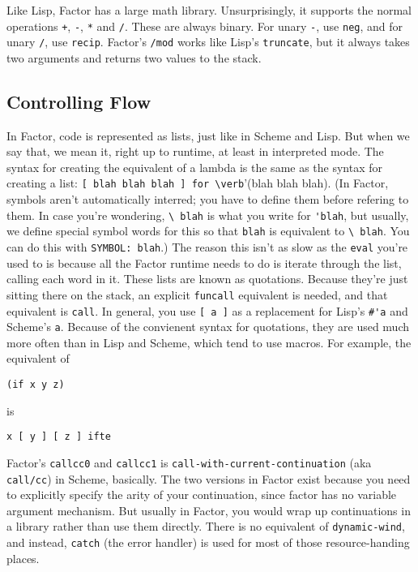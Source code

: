 \documentclass{article}
\begin{document}
Like Lisp, Factor has a large math library. Unsurprisingly, it supports the normal operations \texttt{+}, \texttt{-}, \texttt{*} and \texttt{/}. These are always binary. For unary \texttt{-}, use \texttt{neg}, and for unary \texttt{/}, use \texttt{recip}. Factor's \texttt{/mod} works like Lisp's \texttt{truncate}, but it always takes two arguments and returns two values to the stack.

\subsection{Controlling Flow}

In Factor, code is represented as lists, just like in Scheme and Lisp. But when we say that, we mean it, right up to runtime, at least in interpreted mode. The syntax for creating the equivalent of a lambda is the same as the syntax for creating a list: \verb|[ blah blah blah ] for \verb|'(blah blah blah). (In Factor, symbols aren't automatically interred; you have to define them before refering to them. In case you're wondering, \verb|\ blah| is what you write for \verb|'blah|, but usually, we define special symbol words for this so that \verb|blah| is equivalent to \verb|\ blah|. You can do this with \verb|SYMBOL: blah|.) The reason this isn't as slow as the \texttt{eval} you're used to is because all the Factor runtime needs to do is iterate through the list, calling each word in it. These lists are known as quotations. Because they're just sitting there on the stack, an explicit \texttt{funcall} equivalent is needed, and that equivalent is \texttt{call}. In general, you use \verb|[ a ]| as a replacement for Lisp's \verb|#'a| and Scheme's \verb|a|. Because of the convienent syntax for quotations, they are used much more often than in Lisp and Scheme, which tend to use macros. For example, the equivalent of
\begin{verbatim}
(if x y z)
\end{verbatim}
is
\begin{verbatim}
x [ y ] [ z ] ifte
\end{verbatim}

Factor's \texttt{callcc0} and \texttt{callcc1} is \texttt{call-with-current-continuation} (aka \texttt{call/cc}) in Scheme, basically. The two versions in Factor exist because you need to explicitly specify the arity of your continuation, since factor has no variable argument mechanism. But usually in Factor, you would wrap up continuations in a library rather than use them directly. There is no equivalent of \texttt{dynamic-wind}, and instead, \texttt{catch} (the error handler) is used for most of those resource-handing places.
\end{document}
